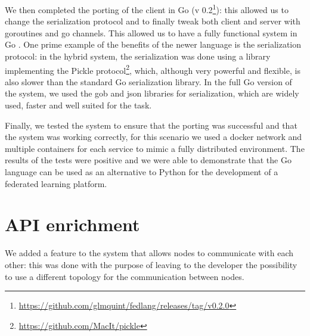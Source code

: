 We then completed the porting of the client in Go (v 0.2\footnote{\url{https://github.com/glmquint/fedlang/releases/tag/v0.2.0}}): this allowed us to change the serialization protocol and to finally tweak both client and server with goroutines and go channels. This allowed us to have a fully functional system in Go . One prime example of the benefits of the newer language is the serialization protocol: in the hybrid system, the serialization was done using a library implementing the Pickle protocol\footnote{\url{https://github.com/MacIt/pickle}}, which, although very powerful and flexible, is also slower than the standard Go serialization library. In the full Go version of the system, we used the gob and json libraries for serialization, which are widely used, faster and well suited for the task.

Finally, we tested the system to ensure that the porting was successful and that the system was working correctly, for this scenario we used a docker network and multiple containers for each service to mimic a fully distributed environment. The results of the tests were positive and we were able to demonstrate that the Go language can be used as an alternative to Python for the development of a federated learning platform.

\section{API enrichment}
We added a feature to the system that allows nodes to communicate with each other: this was done with the purpose of leaving to the developer the possibility to use a different topology for the communication between nodes. 
